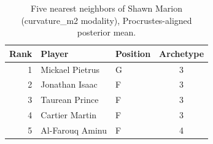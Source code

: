 \begin{table}[htbp]
  \centering\small
  \begin{tabular}{rllc}
    \toprule
    Rank & Player & Position & Archetype \\
    \midrule
    1 & Mickael Pietrus & G & 3 \\
    2 & Jonathan Isaac & F & 3 \\
    3 & Taurean Prince & F & 3 \\
    4 & Cartier Martin & F & 3 \\
    5 & Al-Farouq Aminu & F & 4 \\
    \bottomrule
  \end{tabular}
  \caption{Five nearest neighbors of Shawn Marion (curvature_m2 modality), Procrustes-aligned posterior mean.}
  \label{tab:Shawn_Marion_neighbors_curvature_m2}
\end{table}

